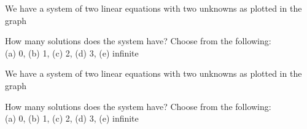 \begin{problem}
We have a system of two linear equations with two unknowns as plotted in the graph

    \begin{minipage}{0.45\columnwidth}
        How many solutions does the system have?  Choose from the following: \\
        (a) 0, \quad (b) 1, \quad (c) 2, \quad (d) 3, \quad (e) infinite
    \end{minipage}
    \begin{minipage}{0.5\columnwidth}
        \begin{center}
        \end{center}
    \end{minipage}

\end{problem}


\begin{problem}
We have a system of two linear equations with two unknowns as plotted in the graph

    \begin{minipage}{0.45\columnwidth}
        How many solutions does the system have?  Choose from the following: \\
        (a) 0, \quad (b) 1, \quad (c) 2, \quad (d) 3, \quad (e) infinite
    \end{minipage}
    \begin{minipage}{0.5\columnwidth}
        \begin{center}
        \end{center}
    \end{minipage}

\end{problem}


